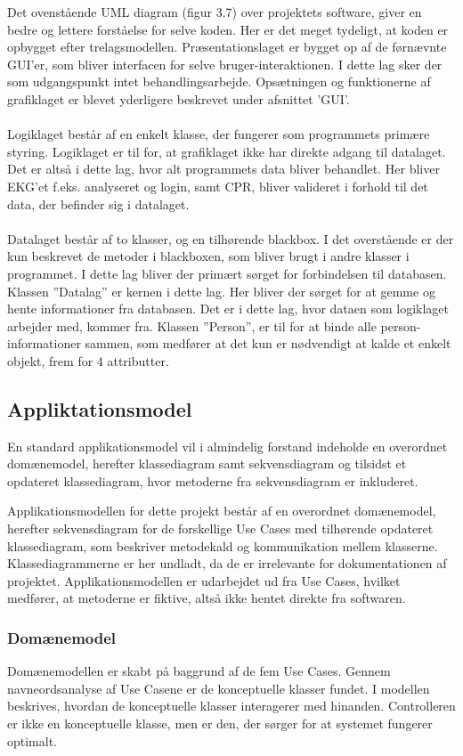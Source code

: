 Det ovenstående UML diagram (figur 3.7) over projektets software, giver en bedre og lettere forståelse for selve koden. Her er det meget tydeligt, at koden er opbygget efter trelagsmodellen. Præsentationslaget er bygget op af de førnævnte GUI’er, som bliver interfacen for selve bruger-interaktionen. I dette lag sker der som udgangspunkt intet behandlingsarbejde. Opsætningen og funktionerne af grafiklaget er blevet yderligere beskrevet under afsnittet ’GUI’.\\ \\
Logiklaget består af en enkelt klasse, der fungerer som programmets primære styring. Logiklaget er til for, at grafiklaget ikke har direkte adgang til datalaget. Det er altså i dette lag, hvor alt programmets data bliver behandlet.  Her bliver EKG’et f.eks. analyseret og login, samt CPR, bliver valideret i forhold til det data, der befinder sig i datalaget. \\ \\
Datalaget består af to klasser, og en tilhørende blackbox. I det overstående er der kun beskrevet de metoder i blackboxen, som bliver brugt i andre klasser i programmet. I dette lag bliver der primært sørget for forbindelsen til databasen. Klassen ”Datalag” er kernen i dette lag. Her bliver der sørget for at gemme og hente informationer fra databasen. Det er i dette lag, hvor dataen som logiklaget arbejder med, kommer fra. Klassen ”Person”, er til for at binde alle person-informationer sammen, som medfører at det kun er nødvendigt at kalde et enkelt objekt, frem for 4 attributter. 

\subsection{Appliktationsmodel}
En standard applikationsmodel vil i almindelig forstand indeholde en overordnet domænemodel, herefter klassediagram samt sekvensdiagram og tilsidst et opdateret klassediagram, hvor metoderne fra sekvensdiagram er inkluderet. 

Applikationsmodellen for dette projekt består af en overordnet domænemodel, herefter sekvensdiagram for de forskellige Use Cases med tilhørende opdateret klassediagram, som beskriver metodekald og kommunikation mellem klasserne. Klassediagrammerne er her undladt, da de er irrelevante for dokumentationen af projektet. Applikationsmodellen er udarbejdet ud fra Use Cases, hvilket medfører, at metoderne er fiktive, altså ikke hentet direkte fra softwaren.  

\subsubsection{Domænemodel}
Domænemodellen er skabt på baggrund af de fem Use Cases. Gennem navneordsanalyse af Use Casene er de konceptuelle klasser fundet. I modellen beskrives, hvordan de konceptuelle klasser interagerer med hinanden. Controlleren er ikke en konceptuelle klasse, men er den, der sørger for at systemet fungerer optimalt.

